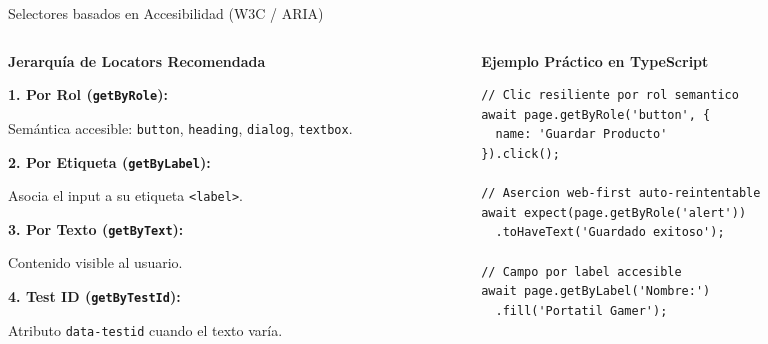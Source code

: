 \documentclass[aspectratio=169]{beamer}
\begin{document}
\begin{frame}[fragile]{Selectores basados en Accesibilidad (W3C / ARIA)}
  \begin{columns}[T,onlytextwidth]
    \begin{column}{0.50\textwidth}
      \begin{tcolorbox}[colback=cbWhite,colframe=cbBorder,arc=4pt,top=5pt,bottom=5pt,left=5pt,right=5pt]
        {\footnotesize\bfseries\color{cbBlue} Jerarquía de Locators Recomendada}\par
        \vspace{0.1cm}
        {\scriptsize
        \textbf{1. Por Rol (\texttt{getByRole}):}\par
        Semántica accesible: \texttt{button}, \texttt{heading}, \texttt{dialog}, \texttt{textbox}.\par\vspace{0.1cm}
        \textbf{2. Por Etiqueta (\texttt{getByLabel}):}\par
        Asocia el input a su etiqueta \texttt{<label>}.\par\vspace{0.1cm}
        \textbf{3. Por Texto (\texttt{getByText}):}\par
        Contenido visible al usuario.\par\vspace{0.1cm}
        \textbf{4. Test ID (\texttt{getByTestId}):}\par
        Atributo \texttt{data-testid} cuando el texto varía.\par
        }
      \end{tcolorbox}
    \end{column}
    \begin{column}{0.48\textwidth}
      \textbf{\scriptsize\color{cbDark} Ejemplo Práctico en TypeScript}
      \begin{lstlisting}[style=tslst]
// Clic resiliente por rol semantico
await page.getByRole('button', { 
  name: 'Guardar Producto' 
}).click();

// Asercion web-first auto-reintentable
await expect(page.getByRole('alert'))
  .toHaveText('Guardado exitoso');

// Campo por label accesible
await page.getByLabel('Nombre:')
  .fill('Portatil Gamer');
      \end{lstlisting}
    \end{column}
  \end{columns}
\end{frame}
\end{document}
